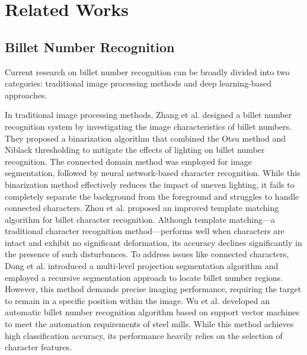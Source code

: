 \section{Related Works}
\label{sec:formatting}
\subsection{Billet Number Recognition }

Current research on billet number recognition can be broadly divided into two categories: traditional image processing methods and deep learning-based approaches.

In traditional image processing methods, Zhang et al. \cite{3} designed a billet number recognition system by investigating the image characteristics of billet numbers. They proposed a binarization algorithm that combined the Otsu method and Niblack thresholding to mitigate the effects of lighting on billet number recognition. The connected domain method was employed for image segmentation, followed by neural network-based character recognition. While this binarization method effectively reduces the impact of uneven lighting, it fails to completely separate the background from the foreground and struggles to handle connected characters. Zhou et al.\cite{4} proposed an improved template matching algorithm for billet character recognition. Although template matching—a traditional character recognition method—performs well when characters are intact and exhibit no significant deformation, its accuracy declines significantly in the presence of such disturbances. To address issues like connected characters, Dong et al.\cite{5} introduced a multi-level projection segmentation algorithm and employed a recursive segmentation approach to locate billet number regions. However, this method demands precise imaging performance, requiring the target to remain in a specific position within the image. Wu et al.\cite{6}  developed an automatic billet number recognition algorithm based on support vector machines to meet the automation requirements of steel mills. While this method achieves high classification accuracy, its performance heavily relies on the selection of character features. 

